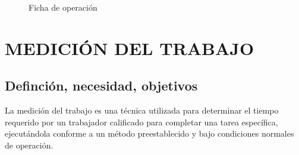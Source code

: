 \documentclass[a4paper,oneside,11pt]{article}
\begin{document}
\begin{figure} [ht!]
    \centering
    \caption{Ficha de operación}
    \label{fig:ficha de operacion}
\end{figure}


\clearpage

\section{MEDICIÓN DEL TRABAJO}

\subsection{Definción, necesidad, objetivos}

La medición del trabajo es una técnica utilizada para determinar el tiempo requerido por un trabajador calificado para completar una tarea específica, ejecutándola conforme a un método preestablecido y bajo condiciones normales de operación.
\end{document}
